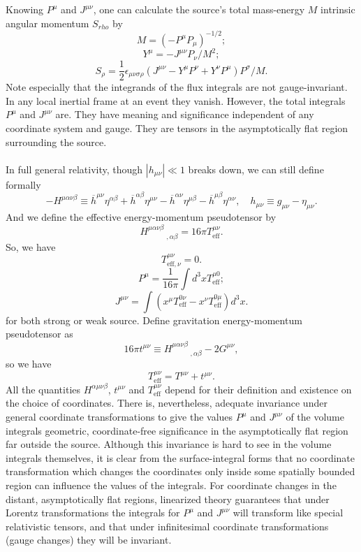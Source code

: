 \noindent
Knowing $P^{\mu}$ and $J^{\mu\nu}$, one can calculate the source's total mass-energy $M$ intrinsic angular momentum $S_{rho}$ by
\[M = (-P^{\mu}P_{\mu})^{-1/2};\]
\[Y^{\mu} = -J^{\mu\nu}P_{\nu}/M^2;\]
\[S_{\rho} = \frac{1}{2}\epsilon_{\mu\nu\sigma\rho}(J^{\mu\nu} - Y^{\mu}P^{\nu} + Y^{\nu}P^{\mu})P^{\sigma}/M.\]
Note especially that the integrands of the flux integrals  are not gauge-invariant. In any local inertial frame at an event they vanish. 
However, the total integrals $P^{\mu}$ and $J^{\mu\nu}$ are. 
They have meaning and significance independent of any coordinate system and gauge. They are tensors in the asymptotically flat region surrounding the source.
\\ \\
In full general relativity, though $|h_{\mu\nu}| \ll 1$ breaks down, we can still define formally
\[-H^{\mu\alpha\nu\beta} \equiv \overline{h}^{\mu\nu}\eta^{\alpha\beta} + \overline{h}^{\alpha\beta}\eta^{\mu\nu} - \overline{h}^{\alpha\nu}\eta^{\mu\beta} - \overline{h}^{\mu\beta}\eta^{\alpha\nu} , \quad h_{\mu\nu} \equiv g_{\mu\nu} - \eta_{\mu\nu}.\]
And we define the effective energy-momentum pseudotensor by
\[H^{\mu\alpha\nu\beta}_{\phantom{****},\alpha
\beta} = 16\pi T^{\mu\nu}_{\mathrm{eff}}.\]
So, we have
\[T^{\mu\nu}_{\mathrm{eff},\nu} = 0.\]
\[P^{\mu} = \frac{1}{16\pi} \int d^3x T^{\mu0}_{\mathrm{eff}};\]
\[J^{\mu\nu} = \int (x^{\mu} T^{0\nu}_{\mathrm{eff}} - x^{\nu} T^{0\mu}_{\mathrm{eff}}) d^3x.\]
for both strong or weak source.
Define gravitation energy-momentum pseudotensor as
\[16\pi t^{\mu\nu} \equiv H^{\mu\alpha\nu\beta}_{\phantom{****},\alpha
\beta} - 2G^{\mu\nu},\]
so we have
\[T^{\mu\nu}_{\mathrm{eff}} = T^{\mu\nu} + t^{\mu\nu}.\]
All the quantities $H^{\alpha\mu\nu\beta}$, $t^{\mu\nu}$ and $T^{\mu\nu}_{\mathrm{eff}}$ depend for their definition and existence on the choice of coordinates.
There is, nevertheless, adequate invariance under general coordinate transformations to give the values $P^{\mu}$ and $J^{\mu\nu}$ of the volume integrals geometric, coordinate-free significance in the asymptotically flat region far outside the source.
Although this invariance is hard to see in the volume integrals themselves, it is clear from the surface-integral forms that no coordinate transformation which changes the coordinates only inside some spatially bounded region can influence the values of the integrals. 
For coordinate changes in the distant, asymptotically
flat regions, linearized theory guarantees that under Lorentz transformations the integrals for $P^{\mu}$ and $J^{\mu\nu}$ will transform like special relativistic tensors, and that under infinitesimal coordinate transformations (gauge changes) they will be invariant.
